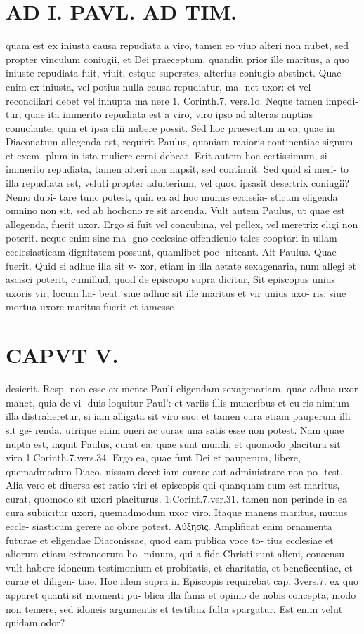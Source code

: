 \documentclass{article}
\begin{document}
\begin{pages}
\section*{AD I. PAVL. AD TIM. }
\marginpar{[ p.276 ]}quam est ex iniusta causa repudiata a viro, tamen eo viuo alteri non nubet, sed propter vinculum coniugii, et Dei praeceptum, quandiu prior ille maritus, a quo iniuste repudiata fuit, viuit, estque superstes, alterius coniugio abstinet. Quae enim ex iniusta, vel potius nulla causa repudiatur, ma- net uxor: et vel reconciliari debet vel innupta ma nere 1. Corinth.7. vers.1o. Neque tamen impedi- tur, quae ita immerito repudiata est a viro, viro ipso ad alteras nuptias conuolante, quin et ipsa alii nubere possit. Sed hoc praesertim in ea, quae in Diaconatum allegenda est, requirit Paulus, quoniam maioris continentiae signum et exem- plum in ista muliere cerni debeat. Erit autem hoc certissimum, si immerito repudiata, tamen alteri non nupsit, sed continuit. Sed quid si meri- to illa repudiata est, veluti propter adulterium, vel quod ipsasit desertrix coniugii? Nemo dubi- tare tunc potest, quin ea ad hoc munus ecclesia- sticum eligenda omnino non sit, sed ab hochono re sit arcenda. Vult autem Paulus, ut quae est allegenda, fuerit uxor. Ergo si fuit vel concubina, vel pellex, vel meretrix eligi non poterit. neque enim sine ma- gno ecclesiae offendiculo tales cooptari in ullam ceclesiasticam dignitatem possunt, quamlibet poe- niteant. Ait Paulus. Quae fuerit. Quid si adhuc illa sit v- xor, etiam in illa aetate sexagenaria, num allegi et ascisci poterit, cumillud, quod de episcopo supra dicitur, Sit episcopus unius uxoris vir, locum ha- beat: siue adhuc sit ille maritus et vir unius uxo- ris: siue mortua uxore maritus fuerit et iamesse 
\section*{CAPVT  V. }
\marginpar{[ p.2 ]}desierit. Resp. non esse ex mente Pauli eligendam sexagenariam, quae adhuc uxor manet, quia de vi- duis loquitur Paul': et variis illis muneribus et cu ris nimium illa distraheretur, si iam alligata sit viro suo: et tamen cura etiam pauperum illi sit ge- renda. utrique enim oneri ac curae una satis esse non potest. Nam quae nupta est, inquit Paulus, curat ea, quae sunt mundi, et quomodo placitura sit viro 1.Corinth.7.vers.34. Ergo ea, quae funt Dei et pauperum, libere, quemadmodum Diaco. nissam decet iam curare aut administrare non po- test. Alia vero et diuersa est ratio viri et episcopis qui quanquam cum est maritus, curat, quomodo sit uxori placiturus. 1.Corint.7.ver.31. tamen non perinde in ea cura subiicitur uxori, quemadmodum uxor viro. Itaque manens maritus, munus eccle- siasticum gerere ac obire potest.     Αύξησις. Amplificat enim ornamenta futurae et eligendae Diaconissae, quod eam publica voce to- tius ecclesiae et aliorum etiam extraneorum ho- minum, qui a fide Christi sunt alieni, consensu vult habere idoneum testimonium et probitatis, et charitatis, et beneficentiae, et curae et diligen- tiae. Hoc idem supra in Episcopis requirebat cap. 3vers.7. ex quo apparet quanti sit momenti pu- blica illa fama et opinio de nobis concepta, modo non temere, sed idoneis argumentis et testibuz fulta spargatur. Est enim velut quidam odor? 

\end{pages}
\end{document}
